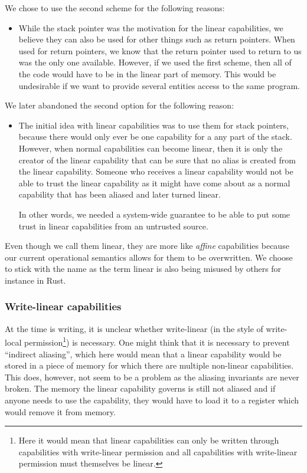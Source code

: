 \documentclass[a4paper]{article}
\begin{document}
We chose to use the second scheme for the following reasons:
\begin{itemize}
\item While the stack pointer was the motivation for the linear capabilities, we believe they can also be used for other things such as return pointers. When used for return pointers, we know that the return pointer used to return to us was the only one available. However, if we used the first scheme, then all of the code would have to be in the linear part of memory. This would be undesirable if we want to provide several entities access to the same program. 
\end{itemize}
We later abandoned the second option for the following reason:
\begin{itemize}
\item The initial idea with linear capabilities was to use them for stack pointers, because there would only ever be one capability for a any part of the stack. However, when normal capabilities can become linear, then it is only the creator of the linear capability that can be sure that no alias is created from the linear capability. Someone who receives a linear capability would not be able to trust the linear capability as it might have come about as a normal capability that has been aliased and later turned linear.

In other words, we needed a system-wide guarantee to be able to put some trust in linear capabilities from an untrusted source.
\end{itemize}

Even though we call them linear, they are more like \emph{affine} capabilities because our current operational semantics allows for them to be overwritten. We choose to stick with the name as the term linear is also being misused by others for instance in Rust.

\subsubsection{Write-linear capabilities}

At the time is writing, it is unclear whether write-linear (in the style of write-local permission\footnote{Here it would mean that linear capabilities can only be written through capabilities with write-linear permission and all capabilities with write-linear permission must themselves be linear.}) is necessary. One might think that it is necessary to prevent ``indirect aliasing'', which here would mean that a linear capability would be stored in a piece of memory for which there are multiple non-linear capabilities. This does, however, not seem to be a problem as the aliasing invariants are never broken. The memory the linear capability governs is still not aliased and if anyone needs to use the capability, they would have to load it to a register which would remove it from memory.
\end{document}
